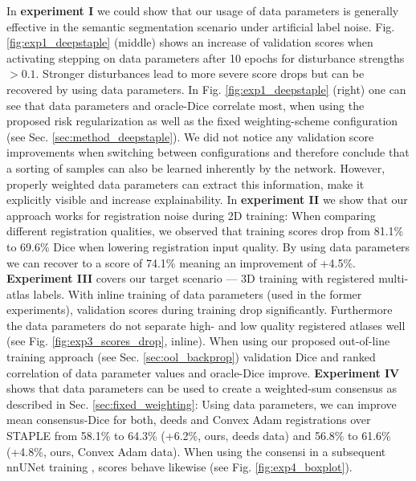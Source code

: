     \label{sec:results}
    In \textbf{experiment I} we could show that our usage of data parameters is generally effective in the semantic segmentation scenario under artificial label noise.
    Fig. \ref{fig:exp1_deepstaple} (middle) shows an increase of validation scores when activating stepping on data parameters after 10 epochs for disturbance strengths \(>0.1\). Stronger disturbances lead to more severe score drops but can be recovered by using data parameters.
    In Fig. \ref{fig:exp1_deepstaple} (right) one can see that data parameters and oracle-Dice correlate most, when using the proposed risk regularization as well as the fixed weighting-scheme configuration (see Sec. \ref{sec:method_deepstaple}). We did not notice any validation score improvements when switching between configurations and therefore conclude that a sorting of samples can also be learned inherently by the network. However, properly weighted data parameters can extract this information, make it explicitly visible and increase explainability.
    In \textbf{experiment II} we show that our approach works for registration noise during 2D training: When comparing different registration qualities, we observed that training scores drop from 81.1\% to 69.6\% Dice when lowering registration input quality. By using data parameters we can recover to a score of 74.1\% meaning an improvement of +4.5\%.
    \textbf{Experiment III} covers our target scenario --- 3D training with registered multi-atlas labels. With inline training of data parameters (used in the former experiments), validation scores during training drop significantly. Furthermore the data parameters do not separate high- and low quality registered atlases well (see Fig. \ref{fig:exp3_scores_drop}, inline). When using our proposed out-of-line training approach (see Sec. \ref{sec:ool_backprop}) validation Dice and ranked correlation of data parameter values and oracle-Dice improve.
    \textbf{Experiment IV} shows that data parameters can be used to create a weighted-sum consensus as described in Sec. \ref{sec:fixed_weighting}: Using data parameters, we can improve mean consensus-Dice for both, deeds and Convex Adam registrations over STAPLE \cite{warfield2004simultaneous} from 58.1\% to 64.3\% (+6.2\%, ours, deeds data) and 56.8\% to 61.6\% (+4.8\%, ours, Convex Adam data).
    When using the consensi in a subsequent nnUNet training \cite{isensee2021nnu}, scores behave likewise (see Fig. \ref{fig:exp4_boxplot}).
